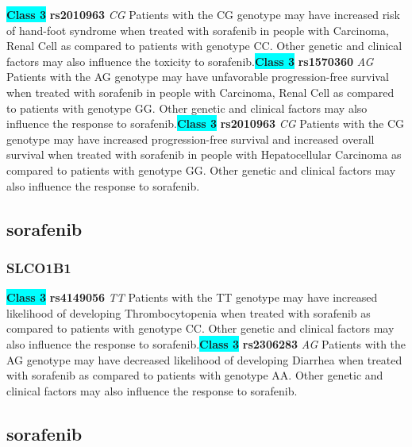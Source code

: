 \documentclass{book}
\begin{document}
\begin{center}
\textbf{\colorbox{cyan} {Class 3}} \textbf{ rs2010963 } \textit{ CG }
Patients with the CG genotype may have increased risk of hand-foot syndrome when treated with sorafenib in people with Carcinoma, Renal Cell as compared to patients with genotype CC. Other genetic and clinical factors may also influence the toxicity to sorafenib.\textbf{\colorbox{cyan} {Class 3}} \textbf{ rs1570360 } \textit{ AG }
Patients with the AG genotype may have unfavorable progression-free survival when treated with sorafenib in people with Carcinoma, Renal Cell as compared to patients with genotype GG. Other genetic and clinical factors may also influence the response to sorafenib.\textbf{\colorbox{cyan} {Class 3}} \textbf{ rs2010963 } \textit{ CG }
Patients with the CG genotype may have increased progression-free survival and increased overall survival when treated with sorafenib in people with Hepatocellular Carcinoma as compared to patients with genotype GG. Other genetic and clinical factors may also influence the response to sorafenib.


\end{center}\subsection{ sorafenib }


\subsubsection{ SLCO1B1 }

\begin{center}
\textbf{\colorbox{cyan} {Class 3}} \textbf{ rs4149056 } \textit{ TT }
Patients with the TT genotype may have increased likelihood of developing Thrombocytopenia when treated with sorafenib as compared to patients with genotype CC. Other genetic and clinical factors may also influence the response to sorafenib.\textbf{\colorbox{cyan} {Class 3}} \textbf{ rs2306283 } \textit{ AG }
Patients with the AG genotype may have decreased likelihood of developing Diarrhea when treated with sorafenib as compared to patients with genotype AA. Other genetic and clinical factors may also influence the response to sorafenib.


\end{center}\subsection{ sorafenib }
\end{document}
